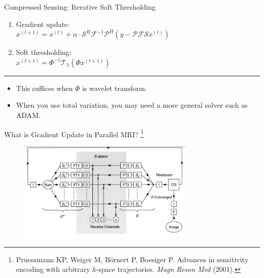 \begin{frame}{Compressed Sensing: Iterative Soft Thresholding}
	\begin{enumerate}
		\item Gradient update:\\
		\hspace{4em} $x^{(t+1)} = x^{(t)} + \alpha \cdot \mathcal{S}^H \mathcal{F}^{-1} \mathcal{P}^{H} (y - \mathcal{P} \mathcal{F} \mathcal{S} x^{(t)})$
		\vspace{2em}
		\item Soft thresholding:\\
		\hspace{4em} $x^{(t+1)} = \Phi^{-1}\mathcal{T}_\lambda(\Phi x^{(t+1)})$
	\end{enumerate}

	\vspace{1em}
	\hrule
	\vspace{1em}

	\begin{itemize}
		\item This suffices when $\Phi$ is wavelet transform.
		\item When you use total variation, you may need a more general solver such as ADAM.
	\end{itemize}

\end{frame}


\begin{frame}{What is Gradient Update in Parallel MRI? \footnote{Pruessmann KP, Weiger M, B\"ornert P, Boesiger P. Advances in sensitivity encoding with arbitrary $k$-space trajectories. \textit{Magn Reson Med} (2001).}}
	\begin{figure}
		\centering
		\includegraphics[width=0.75\textwidth]{fig/cgsense.png}
	\end{figure}
\end{frame}


